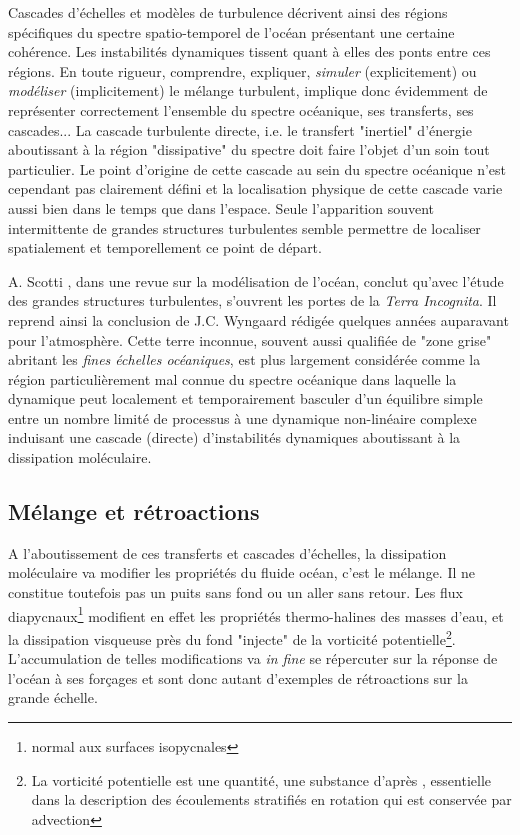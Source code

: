 Cascades d'échelles et modèles de turbulence décrivent ainsi des régions spécifiques du spectre spatio-temporel de l'océan présentant une certaine cohérence. Les instabilités dynamiques tissent quant à elles des ponts entre ces régions. En toute rigueur, comprendre, expliquer, \textit{simuler} (explicitement) ou \textit{modéliser} (implicitement) le mélange turbulent, implique donc évidemment de représenter correctement l'ensemble du spectre océanique, ses transferts, ses cascades... La cascade turbulente directe, i.e. le transfert "inertiel" d'énergie aboutissant à la région "dissipative" du spectre doit faire l'objet d'un soin tout particulier. Le point d'origine de cette cascade au sein du spectre océanique n'est cependant pas clairement défini et la localisation physique de cette cascade varie aussi bien dans le temps que dans l'espace. Seule l'apparition souvent intermittente de grandes structures turbulentes semble permettre de localiser spatialement et temporellement ce point de départ.

A. Scotti \citep{scotti_large_2010}, dans une revue sur la modélisation de l'océan, conclut qu’avec l'étude des grandes structures turbulentes, s'ouvrent les portes de la \textit{Terra Incognita}. Il reprend ainsi la conclusion de J.C. Wyngaard \citep{wyngaard_toward_2004} rédigée quelques années auparavant pour l'atmosphère. Cette terre inconnue, souvent aussi qualifiée de "zone grise" abritant les \textit{fines échelles océaniques}, est plus largement considérée comme la région particulièrement mal connue du spectre océanique dans laquelle la dynamique peut localement et temporairement basculer d'un équilibre simple entre un nombre limité de processus à une dynamique non-linéaire complexe induisant une cascade (directe) d'instabilités dynamiques aboutissant à la dissipation moléculaire. 

\subsection{Mélange et rétroactions}
\label{subsection_retroactions}

A l'aboutissement de ces transferts et cascades d'échelles, la dissipation moléculaire va modifier les propriétés du fluide océan, c'est le mélange.
Il ne constitue toutefois pas un puits sans fond ou un aller sans retour. Les flux diapycnaux\footnote{normal aux surfaces isopycnales} modifient en effet les propriétés thermo-halines des masses d'eau, et la dissipation visqueuse près du fond "injecte" de la vorticité potentielle\footnote{La vorticité potentielle est une quantité, une substance d'après \cite{haynes_conservation_1990}, essentielle dans la description des écoulements stratifiés en rotation qui est conservée par advection}. L'accumulation de telles modifications va \textit{in fine} se répercuter sur la réponse de l'océan à ses forçages et sont donc autant d'exemples de rétroactions sur la grande échelle.

